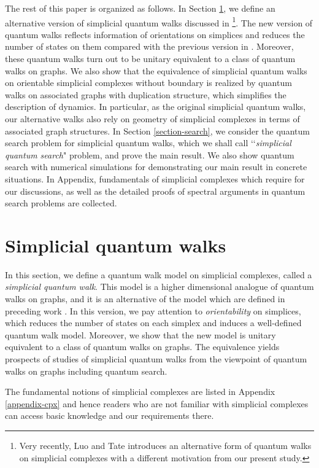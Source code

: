 \documentclass[a4paper,12pt]{article}
\numberwithin{equation}{section}
\begin{document}
\par
\bigskip
The rest of this paper is organized as follows.
In Section \ref{section-SQW}, we define an alternative version of simplicial quantum walks discussed in \cite{MOSver1}\footnote{
Very recently, Luo and Tate \cite{LT2017} introduces an alternative form of quantum walks on simplicial complexes with a different motivation from our present study.
}.
The new version of quantum walks reflects information of orientations on simplices and reduces the number of states on them compared with the previous version in \cite{MOSver1}.
Moreover, these quantum walks turn out to be unitary equivalent to a class of quantum walks on graphs.
We also show that the equivalence of simplicial quantum walks on orientable simplicial complexes without boundary is realized by quantum walks on associated graphs with duplication structure, which simplifies the description of dynamics.
In particular, as the original simplicial quantum walks, our alternative walks also rely on geometry of simplicial complexes in terms of associated graph structures.
%
In Section \ref{section-search}, we consider the quantum search problem for simplicial quantum walks, which we shall call \lq\lq {\em simplicial quantum search}" problem, and prove the main result.
We also show quantum search with numerical simulations for demonstrating our main result in concrete situations.
In Appendix, fundamentals of simplicial complexes which require for our discussions, as well as the detailed proofs of spectral arguments in quantum search problems are collected.

%
%
\section{Simplicial quantum walks}
\label{section-SQW}

In this section, we define a quantum walk model on simplicial complexes, called a {\em simplicial quantum walk}.
This model is a higher dimensional analogue of quantum walks on graphs, and it is an alternative of the model which are defined in preceding work \cite{MOSver1}.
In this version, we pay attention to {\em orientability} on simplices, which reduces the number of states on each simplex and induces a well-defined quantum walk model.
Moreover, we show that the new model is unitary equivalent to a class of quantum walks on graphs.
The equivalence yields prospects of studies of simplicial quantum walks from the viewpoint of quantum walks on graphs including quantum search.
\par
The fundamental notions of simplicial complexes are listed in Appendix \ref{appendix-cpx} and hence readers who are not familiar with simplicial complexes can access basic knowledge and our requirements there.
\end{document}
